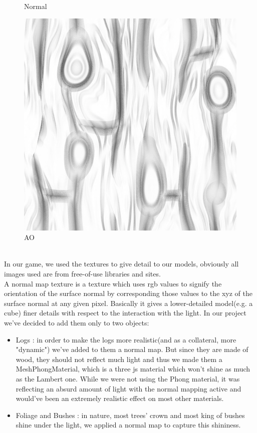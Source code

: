 \documentclass[a4paper, 11pt]{article}
\begin{document}
\begin{figure}[!h]
  \caption{Normal}\label{fig:n_img}
\endminipage\hfill
{}%
  \includegraphics[width=\linewidth]{sidelogao.jpg}
  \caption{AO}\label{fig:ao_img}
\endminipage
\end{figure}
\\
In our game, we used the textures to give detail to our models, obviously all images used are from free-of-use libraries and sites.\\
A normal map texture is a texture which uses rgb values to signify the orientation of the surface normal by corresponding those values to the xyz of the surface normal at any given pixel. Basically it gives a lower-detailed model(e.g. a cube) finer details with respect to the interaction with the light. In our project we've decided to add them only to two objects:
\begin{itemize}
\item Logs : in order to make the logs more realistic(and as a collateral, more "dynamic") we've added to them a normal map. But since they are made of wood, they should not reflect much light and thus we made them a MeshPhongMaterial, which is a three js material which won't shine as much as the Lambert one. While we were not using the Phong material, it was reflecting an absurd amount of light with the normal mapping active and would've been an extremely realistic effect on most other materials.
\item Foliage and Bushes : in nature, most trees' crown and most king of bushes shine under the light, we applied a normal map to capture this shininess.
\end{itemize}
\end{document}
